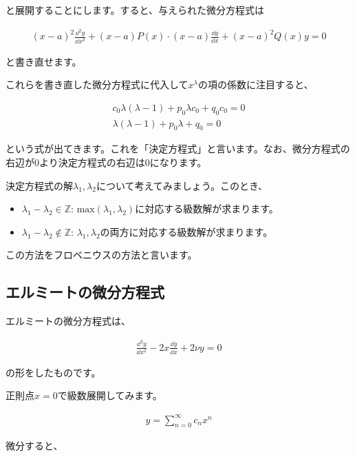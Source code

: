 \noindent
と展開することにします。すると、与えられた微分方程式は

\begin{eqnarray}
    (x-a)^2\frac{\dd^2 y}{\dd x^2}+(x-a)P(x)\cdot(x-a)\frac{\dd y}{\dd x}+(x-a)^2Q(x)y=0
\end{eqnarray}

\noindent
と書き直せます。

これらを書き直した微分方程式に代入して$x^\lambda$の項の係数に注目すると、

\begin{eqnarray}
    c_0\lambda(\lambda-1)+p_0\lambda c_0+q_0c_0=0 \\
    \lambda(\lambda-1)+p_0\lambda+q_0=0
\end{eqnarray}

\noindent
という式が出てきます。これを「決定方程式」と言います。なお、微分方程式の右辺が0より決定方程式の右辺は0になります。

決定方程式の解$\lambda_1,\lambda_2$について考えてみましょう。このとき、

\begin{itemize}
    \item $\lambda_1-\lambda_2\in \mathbb{Z}$: $\mathrm{max}(\lambda_1,\lambda_2)$に対応する級数解が求まります。
    \item $\lambda_1-\lambda_2\notin \mathbb{Z}$: $\lambda_1,\lambda_2$の両方に対応する級数解が求まります。
\end{itemize}

この方法をフロベニウスの方法と言います。








\subsection{エルミートの微分方程式}
\label{hermite}
エルミートの微分方程式は、

\begin{eqnarray}
    \frac{\dd^2 y}{\dd x^2}-2x\frac{\dd y}{\dd x}+2\nu y=0
\end{eqnarray}

\noindent
の形をしたものです。

正則点$x=0$で級数展開してみます。

\begin{eqnarray}
    y=\sum_{n=0}^\infty c_nx^n
\end{eqnarray}

微分すると、

